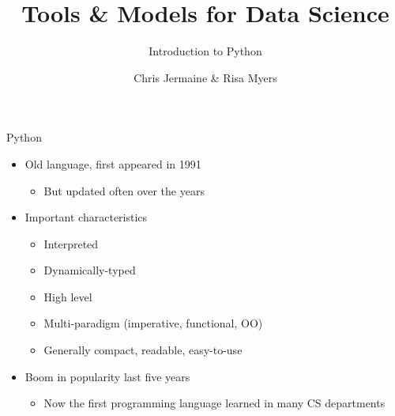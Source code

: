 \documentclass[aspectratio=169]{beamer}
\title[]
{Tools \& Models for Data Science}
\subtitle{Introduction to Python}
\author[]{Chris Jermaine \& Risa Myers}
\institute
{
  Rice University
}
\date[]{}
\begin{document}
\begin{frame}
 \titlepage
\end{frame}

\begin{frame}{Python}

\begin{itemize}
\item Old language, first appeared in 1991
	\begin{itemize}
	\item But updated often over the years
	\end{itemize}
\item Important characteristics
	\begin{itemize}
	\item Interpreted
	\item Dynamically-typed
	\item High level
	\item Multi-paradigm (imperative, functional, OO) 
	\item Generally compact, readable, easy-to-use
	\end{itemize}
\item Boom in popularity last five years
	\begin{itemize}
\item Now the first programming language learned in many CS departments
	\end{itemize}
\end{itemize}
\end{frame}
\end{document}
